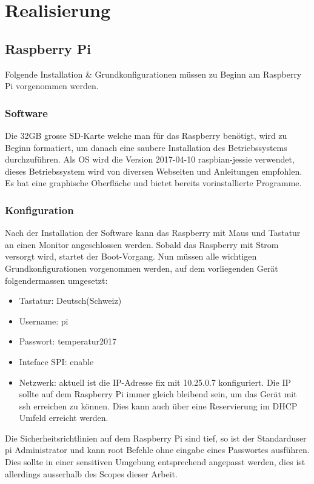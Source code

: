 \section{Realisierung}

\subsection{Raspberry Pi}

Folgende Installation \& Grundkonfigurationen müssen zu Beginn am Raspberry Pi vorgenommen werden.

\subsubsection{Software}
Die 32GB grosse SD-Karte welche man für das Raspberry benötigt, wird zu Beginn formatiert, um danach eine saubere Installation des Betriebssystems durchzuführen. Als OS wird die Version 2017-04-10 raspbian-jessie verwendet, dieses Betriebssystem wird von diversen Webseiten und Anleitungen empfohlen. Es hat eine graphische Oberfläche und bietet bereits vorinstallierte Programme.

\subsubsection{Konfiguration}
Nach der Installation der Software kann das Raspberry mit Maus und Tastatur an einen Monitor angeschlossen werden. Sobald das Raspberry mit Strom versorgt wird, startet der Boot-Vorgang.
Nun müssen alle wichtigen Grundkonfigurationen vorgenommen werden, auf dem vorliegenden Gerät folgendermassen umgesetzt:
\begin{itemize}
\item Tastatur: Deutsch(Schweiz)
\item Username: pi
\item Passwort: temperatur2017
\item Inteface SPI: enable
\item Netzwerk: aktuell ist die IP-Adresse fix mit 10.25.0.7 konfiguriert. Die IP sollte auf dem Raspberry Pi immer gleich bleibend sein, um das Gerät mit ssh erreichen zu können. Dies kann auch über eine Reservierung im DHCP Umfeld erreicht werden.
\end{itemize}

Die Sicherheitsrichtlinien auf dem Raspberry Pi sind tief, so ist der Standarduser pi Administrator und kann root Befehle ohne eingabe eines Passwortes ausführen. Dies sollte in einer sensitiven Umgebung entsprechend angepasst werden, dies ist allerdings ausserhalb des Scopes dieser Arbeit.

